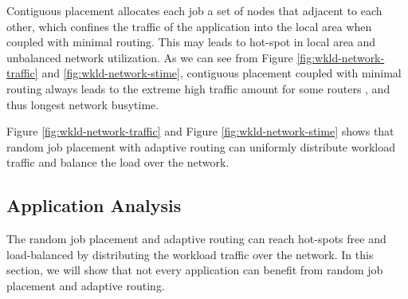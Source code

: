 \documentclass[conference,compsoc]{IEEEtran}
\begin{document}
Contiguous placement allocates each job a set of nodes that adjacent to each other, which confines the traffic of the application into the local area when coupled with minimal routing. This may leads to hot-spot in local area and unbalanced network utilization. As we can see from Figure \ref{fig:wkld-network-traffic} and \ref{fig:wkld-network-stime}, contiguous placement coupled with minimal routing always leads to the extreme high traffic amount for some routers , and thus longest network busytime.

Figure \ref{fig:wkld-network-traffic} and Figure \ref{fig:wkld-network-stime} shows that random job placement with adaptive routing can uniformly distribute workload traffic and balance the load over the network. 

\subsection{Application Analysis}
\label{sec:app analysis}

The random job placement and adaptive routing can reach hot-spots free and load-balanced by distributing the workload traffic over the network. In this section, we will show that not every application can benefit from random job placement and adaptive routing. 
\end{document}
